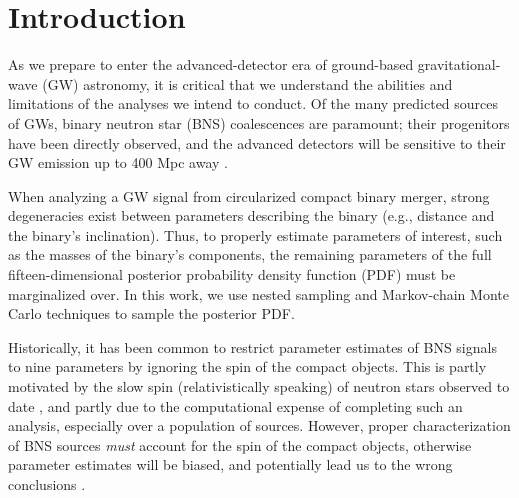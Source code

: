 \section{Introduction}

As we prepare to enter the advanced-detector era of ground-based gravitational-wave (GW) astronomy, it is critical that we understand the abilities and limitations of the analyses we intend to conduct.  Of the many predicted sources of GWs, binary neutron star (BNS) coalescences are paramount; their progenitors have been directly observed, and the advanced detectors will be sensitive to their GW emission up to 400 Mpc away \citep{2013arXiv1304.0670L}.

When analyzing a GW signal from circularized compact binary merger, strong degeneracies exist between parameters describing the binary (e.g., distance and the binary's inclination).  Thus, to properly estimate parameters of interest, such as the masses of the binary's components, the remaining parameters of the full fifteen-dimensional posterior probability density function (PDF) must be marginalized over.  In this work, we use nested sampling \citep{Veitch_2010} and Markov-chain Monte Carlo \citep{Christensen_2003,R_ver_2006,van_der_Sluys_2008} techniques to sample the posterior PDF.

Historically, it has been common to restrict parameter estimates of BNS signals to nine parameters by ignoring the spin of the compact objects.  This is partly motivated by the slow spin (relativistically speaking) of neutron stars observed to date \citep[e.g.,][]{Mandel_2010}, and partly due to the computational expense of completing such an analysis, especially over a population of sources.  However, proper characterization of BNS sources \emph{must} account for the spin of the compact objects, otherwise parameter estimates will be biased, and potentially lead us to the wrong conclusions \citep{Buonanno_2009,Berry_2014}.

